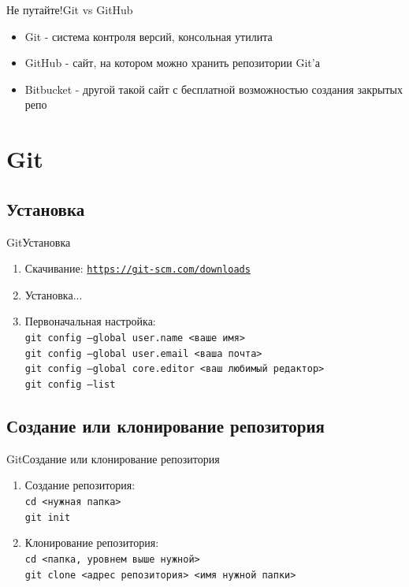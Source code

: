 \documentclass[10pt]{beamer}
\begin{document}
\begin{frame}[fragile]{Не путайте!}{Git vs GitHub}
\begin{itemize}
    \item Git - система контроля версий, консольная утилита
    \item GitHub - сайт, на котором можно хранить репозитории Git'а
    \item Bitbucket - другой такой сайт с бесплатной возможностью создания закрытых репо
\end{itemize}
\end{frame}

\section{Git}
\subsection{Установка}

\begin{frame}[fragile]{Git}{Установка}
\begin{enumerate}
\item Скачивание: \href{https://git-scm.com/downloads}{\texttt{https://git-scm.com/downloads}}
\item Установка...
\item Первоначальная настройка: \\
\texttt{git config ---global user.name <ваше имя>}\\
\texttt{git config ---global user.email <ваша почта>}\\
\texttt{git config ---global core.editor <ваш любимый редактор>}\\
\texttt{git config ---list}
\end{enumerate}
\end{frame}

\subsection{Создание или клонирование репозитория}
\begin{frame}[fragile]{Git}{Создание или клонирование репозитория}
\begin{enumerate}
\item Создание репозитория:\\
\texttt{cd <нужная папка>}\\
\texttt{git init}\\

\item Клонирование репозитория: \\
\texttt{cd <папка, уровнем выше нужной>}\\
\texttt{git clone <адрес репозитория> <имя нужной папки>}\\
\end{enumerate}
\end{frame}
\end{document}
